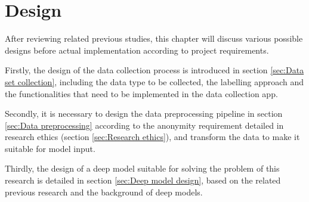 \chapter{Design}
\label{chap:Design}
After reviewing related previous studies, this chapter will discuss various possible designs before actual implementation according to project requirements.

Firstly, the design of the data collection process is introduced in section \ref{sec:Data set collection}, including the data type to be collected, the labelling approach and the functionalities that need to be implemented in the data collection app.

Secondly, it is necessary to design the data preprocessing pipeline in section \ref{sec:Data preprocessing} according to the anonymity requirement detailed in research ethics (section \ref{sec:Research ethics}), and transform the data to make it suitable for model input.

Thirdly, the design of a deep model suitable for solving the problem of this research is detailed in section \ref{sec:Deep model design}, based on the related previous research and the background of deep models.


